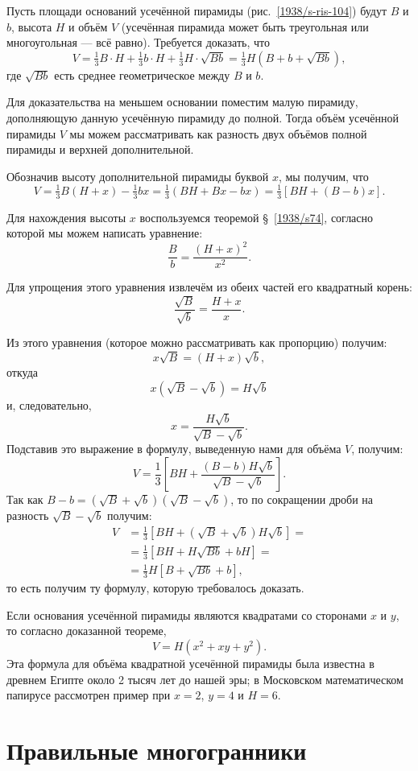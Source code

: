 Пусть площади оснований усечённой пирамиды (рис.~\ref{1938/s-ris-104}) будут $B$ и $b$, высота $H$ и объём $V$ (усечённая пирамида может быть треугольная или многоугольная — всё равно).
Требуется доказать, что
\[V = \tfrac13B\cdot H + \tfrac13 b \cdot H + \tfrac13 H\cdot \sqrt{Bb} = \tfrac13 H(B + b + \sqrt{Bb}),\]
где $\sqrt{Bb}$ есть среднее геометрическое между $B$ и $b$.

Для доказательства на меньшем основании поместим малую пирамиду, дополняющую данную усечённую пирамиду до полной.
Тогда объём усечённой пирамиды $V$ мы можем рассматривать как разность двух объёмов полной пирамиды и верхней дополнительной.

Обозначив высоту дополнительной пирамиды буквой $x$, мы получим, что
\[V = \tfrac13B(H + x)- \tfrac13bx = \tfrac13(BH + Bx-bx) = \tfrac13 [BH + (B - b)x].\]

Для нахождения высоты $x$ воспользуемся теоремой §~\ref{1938/s74}, согласно которой мы можем написать уравнение:
\[\frac Bb=\frac{(H+x)^2}{x^2}.\]

Для упрощения этого уравнения извлечём из обеих частей его квадратный корень:
\[\frac {\sqrt{B}}{\sqrt{b}}=\frac{H+x}{x}.\]

Из этого уравнения (которое можно рассматривать как пропорцию) получим:
\[x\sqrt{B}=(H+x)\sqrt{b},\]
откуда
\[x(\sqrt{B}-\sqrt{b})=H\sqrt{b}\]
и, следовательно,
\[x=\frac{H\sqrt{b}}{\sqrt{B}-\sqrt{b}}.\]
Подставив это выражение в формулу, выведенную нами для объёма $V$, получим:
\[V=\frac13\left[BH+\frac{(B-b)H\sqrt{b}}{\sqrt{B}-\sqrt{b}}\right].\]
Так как $B - b= (\sqrt{B} + \sqrt{b})(\sqrt{B} - \sqrt{b})$, то по сокращении дроби на разность $\sqrt{B} - \sqrt{b}$ получим:
\begin{align*}
V&=\frac13\left[BH+(\sqrt{B}+\sqrt{b})H\sqrt{b}\right]=
\\
&=\frac13\left[BH+H\sqrt{Bb}+bH\right]=
\\
&=\frac13 H\left[B+\sqrt{Bb}+b\right],
\end{align*}
то есть получим ту формулу, которую требовалось доказать.

\medskip

Если основания усечённой пирамиды являются квадратами со сторонами $x$ и $y$, то согласно доказанной теореме, 
\[V=H(x^2+xy+y^2).\]
Эта формула для объёма квадратной усечённой пирамиды была известна в древнем Египте около 2 тысяч лет до нашей эры; в Московском математическом папирусе рассмотрен пример при $x=2$, $y=4$ и $H=6$.

\section{Правильные многогранники}

